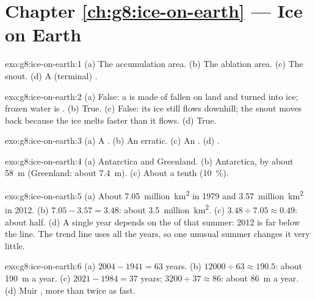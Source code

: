 \section*{Chapter \ref{ch:g8:ice-on-earth} --- Ice on Earth}

\begin{solution}{exo:g8:ice-on-earth:1}
(a) The accumulation area. (b) The ablation area. (c) The snout. (d) A
(terminal) .
\end{solution}

\begin{solution}{exo:g8:ice-on-earth:2}
(a) False: a  is made of  fallen on land and turned into ice;
frozen  water is . (b) True. (c) False: its ice still flows
downhill; the snout moves back because the ice melts faster than it
flows. (d) True.
\end{solution}

\begin{solution}{exo:g8:ice-on-earth:3}
(a) A . (b) An erratic. (c) An . (d) .
\end{solution}

\begin{solution}{exo:g8:ice-on-earth:4}
(a) Antarctica and Greenland. (b) Antarctica, by about \qty{58}{m}
(Greenland: about \qty{7.4}{m}). (c) About a tenth (10~\%).
\end{solution}

\begin{solution}{exo:g8:ice-on-earth:5}
(a) About \num{7.05}~million~\unit{km^2} in 1979 and \num{3.57}~million~\unit{km^2}
in 2012. (b) $7.05 - 3.57 = 3.48$: about \num{3.5}~million~\unit{km^2}.
(c) $3.48 \div 7.05 \approx 0.49$: about half. (d) A single year depends
on the  of that summer: 2012 is far below the line. The trend line
uses all the years, so one unusual summer changes it very little.
\end{solution}

\begin{solution}{exo:g8:ice-on-earth:6}
(a) $2004 - 1941 = 63$ years. (b) $12000 \div 63 \approx 190.5$: about
\qty{190}{m} a year. (c) $2021 - 1984 = 37$ years; $3200 \div 37 \approx
86$: about \qty{86}{m} a year. (d) Muir , more than twice as fast.
\end{solution}

